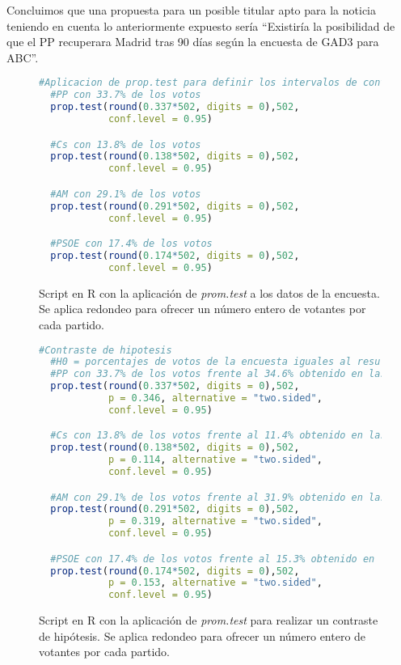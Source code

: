 \documentclass[11pt,a4paper]{article}
\begin{document}
Concluimos que una propuesta para un posible titular apto para la noticia teniendo en cuenta lo anteriormente expuesto sería ``Existiría la posibilidad de que el PP recuperara Madrid tras 90 días según la encuesta de GAD3 para ABC''.

\begin{figure}
\centering
\begin{lstlisting}[language=R]
  #Aplicacion de prop.test para definir los intervalos de confianza con n = 502 y nivel de confianza del 95%
  #PP con 33.7% de los votos
  prop.test(round(0.337*502, digits = 0),502,
            conf.level = 0.95)

  #Cs con 13.8% de los votos
  prop.test(round(0.138*502, digits = 0),502,
            conf.level = 0.95)

  #AM con 29.1% de los votos
  prop.test(round(0.291*502, digits = 0),502,
            conf.level = 0.95)

  #PSOE con 17.4% de los votos
  prop.test(round(0.174*502, digits = 0),502,
            conf.level = 0.95)
\end{lstlisting}
\caption{Script en R con la aplicación de \textit{prom.test} a los datos de la encuesta. Se aplica redondeo para ofrecer un número entero de votantes por cada partido.}
\label{fig:proptest}
\end{figure}

\begin{figure}
\centering
\begin{lstlisting}[language=R]
  #Contraste de hipotesis
  #H0 = porcentajes de votos de la encuesta iguales al resultado electoral
  #PP con 33.7% de los votos frente al 34.6% obtenido en las elecciones
  prop.test(round(0.337*502, digits = 0),502,
            p = 0.346, alternative = "two.sided",
            conf.level = 0.95)

  #Cs con 13.8% de los votos frente al 11.4% obtenido en las elecciones
  prop.test(round(0.138*502, digits = 0),502,
            p = 0.114, alternative = "two.sided",
            conf.level = 0.95)

  #AM con 29.1% de los votos frente al 31.9% obtenido en las elecciones
  prop.test(round(0.291*502, digits = 0),502,
            p = 0.319, alternative = "two.sided",
            conf.level = 0.95)

  #PSOE con 17.4% de los votos frente al 15.3% obtenido en las elecciones
  prop.test(round(0.174*502, digits = 0),502,
            p = 0.153, alternative = "two.sided",
            conf.level = 0.95)
\end{lstlisting}
\caption{Script en R con la aplicación de \textit{prom.test} para realizar un contraste de hipótesis. Se aplica redondeo para ofrecer un número entero de votantes por cada partido.}
\label{fig:contraste}
\end{figure}
\end{document}

